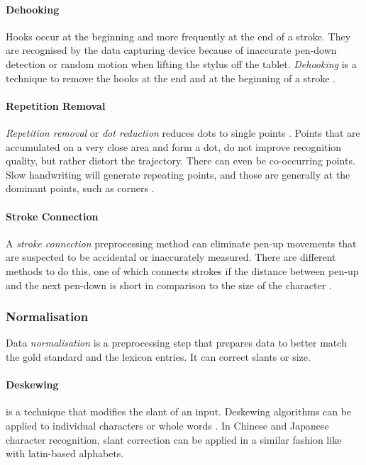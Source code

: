 \paragraph{Dehooking}
\label{sec:dehooking}
Hooks occur at the beginning and more frequently at the end of a stroke. They
are recognised by the data capturing device because of inaccurate pen-down 
detection or random motion when lifting the stylus off the tablet.
\emph{Dehooking} is a technique to remove the hooks at the end and at the 
beginning of a stroke .

\paragraph{Repetition Removal}
\label{sec:repetitionremoval}
\emph{Repetition removal} or \emph{dot reduction} reduces dots to single points
. Points that are accumulated on a very close area and 
form a dot, do not improve recognition quality, but rather distort the 
trajectory. There can even be co-occurring points. Slow handwriting will generate
repeating points, and those are generally at the dominant points, such as
corners .

\paragraph{Stroke Connection}
\label{sec:strokeconnection}
A \emph{stroke connection} preprocessing method can eliminate pen-up movements
that are suspected to be accidental or inaccurately measured. There are different
methods to do this, one of which connects strokes if the distance between pen-up
and the next pen-down is short in comparison to the size of the character 
.

\subsubsection{Normalisation} 
\label{sec:normalisation}
Data \emph{normalisation} is a preprocessing step that prepares data to better
match the gold standard and the lexicon entries. It can correct slants or size.

\paragraph{Deskewing}
is a technique that modifies the slant of an input. Deskewing 
algorithms can be applied to individual characters or whole words . In Chinese and Japanese character recognition, slant correction can
be applied in a similar fashion like with latin-based alphabets.

